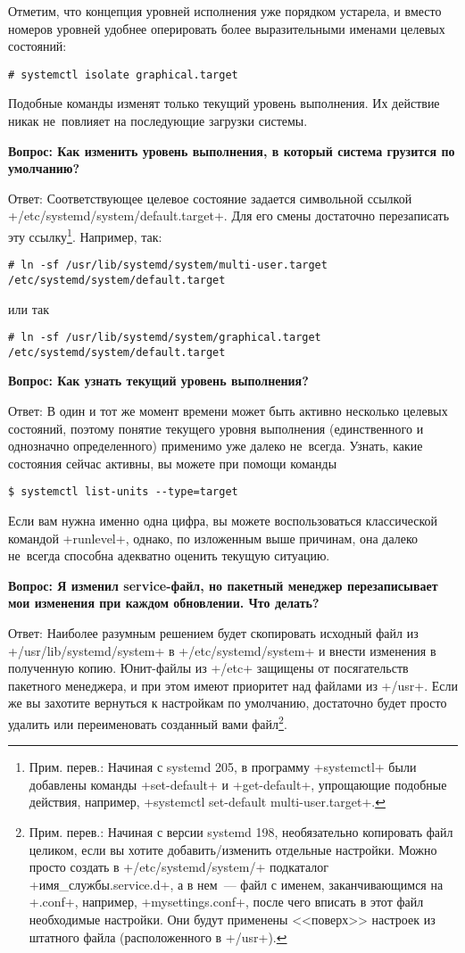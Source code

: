\documentclass[10pt,oneside,a4paper]{article}
\newcommand{\qna}[1]{\medskip\par\textbf{Вопрос: #1}\par Ответ:}
\begin{document}
Отметим, что концепция уровней исполнения уже порядком устарела, и вместо
номеров уровней удобнее оперировать более выразительными именами целевых
состояний:
\begin{Verbatim}
# systemctl isolate graphical.target
\end{Verbatim}

Подобные команды изменят только текущий уровень выполнения. Их действие никак
не~повлияет на последующие загрузки системы.

\qna{Как изменить уровень выполнения, в который система грузится по умолчанию?}
Соответствующее целевое состояние задается символьной ссылкой
+/etc/systemd/system/default.target+. Для его смены достаточно перезаписать эту
ссылку\footnote{Прим. перев.: Начиная с systemd 205, в программу +systemctl+
были добавлены команды +set-default+ и +get-default+, упрощающие подобные
действия, например, +systemctl set-default multi-user.target+.}. Например, так:
\begin{Verbatim}
# ln -sf /usr/lib/systemd/system/multi-user.target /etc/systemd/system/default.target
\end{Verbatim}
или так
\begin{Verbatim}
# ln -sf /usr/lib/systemd/system/graphical.target /etc/systemd/system/default.target
\end{Verbatim}

\qna{Как узнать текущий уровень выполнения?}
В один и тот же момент времени может быть активно несколько целевых состояний,
поэтому понятие текущего уровня выполнения (единственного и однозначно
определенного) применимо уже далеко не~всегда. Узнать, какие состояния сейчас
активны, вы можете при помощи команды
\begin{Verbatim}
$ systemctl list-units --type=target
\end{Verbatim}

Если вам нужна именно одна цифра, вы можете воспользоваться классической
командой +runlevel+, однако, по изложенным выше причинам, она далеко не~всегда
способна адекватно оценить текущую ситуацию.

\qna{Я изменил service-файл, но пакетный менеджер перезаписывает мои изменения
при каждом обновлении. Что делать?}
Наиболее разумным решением будет скопировать исходный файл из
+/usr/lib/systemd/system+ в +/etc/systemd/system+ и внести изменения в
полученную копию. Юнит-файлы из +/etc+ защищены от посягательств пакетного
менеджера, и при этом имеют приоритет над файлами из +/usr+. Если же вы захотите
вернуться к настройкам по умолчанию, достаточно будет просто удалить или
переименовать созданный вами файл\footnote{Прим. перев.: Начиная с версии
systemd 198, необязательно копировать файл целиком, если вы хотите
добавить/изменить отдельные настройки. Можно просто создать в
+/etc/systemd/system/+ подкаталог +имя_службы.service.d+, а в нем~--- файл с
именем, заканчивающимся на +.conf+, например, +mysettings.conf+, после чего
вписать в этот файл необходимые настройки. Они будут применены <<поверх>>
настроек из штатного файла (расположенного в +/usr+).}.
\end{document}
